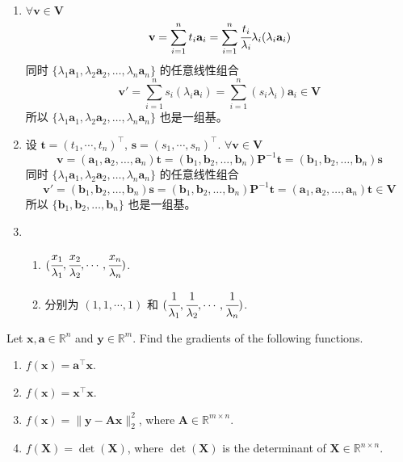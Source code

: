 \documentclass[11pt,letter,notitlepage]{article}
\begin{document}
\begin{solution}
    \begin{enumerate}
        \item $\forall \mathbf{v}\in \mathbf{V}$
              $$\mathbf{v}=\sum_{i=1}^n t_i \mathbf{a}_i=\sum_{i=1}^n \cfrac{t_i}{\lambda_i} \lambda_i (\lambda_i \mathbf{a}_i)$$
              同时 $\{\lambda_1 \mathbf{a}_1, \lambda_2 \mathbf{a}_2, \dots, \lambda_n\mathbf{a}_n\}$ 的任意线性组合
              $$\mathbf{v}'=\sum_{i=1}^n s_i (\lambda_i \mathbf{a}_i)=\sum_{i=1}^n (s_i \lambda_i) \mathbf{a}_i\in \mathbf{V}$$
              所以  $\{\lambda_1 \mathbf{a}_1, \lambda_2 \mathbf{a}_2, \dots, \lambda_n\mathbf{a}_n\}$ 也是一组基。
        \item 设 $\mathbf{t}=(t_1,\cdots,t_n)^\top$, $\mathbf{s}=(s_1,\cdots,s_n)^\top$. $\forall \mathbf{v}\in\mathbf{V}$
              $$\mathbf{v}=(\mathbf{a}_1,\mathbf{a}_2, \dots, \mathbf{a}_n)\mathbf{t}=(\mathbf{b}_1,\mathbf{b}_2,\dots, \mathbf{b}_n)\mathbf{P}^{-1}\mathbf{t}=(\mathbf{b}_1,\mathbf{b}_2,\dots, \mathbf{b}_n)\mathbf{s}$$
              同时 $\{\lambda_1 \mathbf{a}_1, \lambda_2 \mathbf{a}_2, \dots, \lambda_n\mathbf{a}_n\}$ 的任意线性组合
              $$\mathbf{v}'=(\mathbf{b}_1,\mathbf{b}_2,\dots, \mathbf{b}_n)\mathbf{s}=(\mathbf{b}_1,\mathbf{b}_2,\dots, \mathbf{b}_n)\mathbf{P}^{-1}\mathbf{t}=(\mathbf{a}_1,\mathbf{a}_2, \dots, \mathbf{a}_n)\mathbf{t}\in \mathbf{V}$$
              所以 $\{ \mathbf{b}_1, \mathbf{b}_2, \dots, \mathbf{b}_n\}$ 也是一组基。
        \item \begin{enumerate}
                  \item $(\cfrac{x_1}{\lambda_1},\cfrac{x_2}{\lambda_2},\cdots,\cfrac{x_n}{\lambda_n})$.
                  \item 分别为 $(1,1,\cdots,1)$ 和 $(\cfrac{1}{\lambda_1},\cfrac{1}{\lambda_2},\cdots,\cfrac{1}{\lambda_n})$.
              \end{enumerate}
    \end{enumerate}
\end{solution}

\newpage


\begin{exercise}
    Let $\mathbf{x},\mathbf{a}\in \mathbb{R}^n$ and $\mathbf{y}\in \mathbb{R}^m$. Find the gradients of the following functions.
    \begin{enumerate}
        \item $f(\mathbf{x}) = \mathbf{a}^{\top}\mathbf{x}$.
        \item $f(\mathbf{x}) = \mathbf{x}^{\top}\mathbf{x}$.
        \item $f(\mathbf{x})=\| \mathbf{y} - \mathbf{A}\mathbf{x} \|_2^2$, where $\mathbf{A}\in\mathbb{R}^{m\times n}$.
        \item  $f(\mathbf{X}) = \det(\mathbf{X})$, where $\det(\mathbf{X})$ is the determinant of $\mathbf{X} \in \mathbb{R}^{n \times n}$.
    \end{enumerate}
\end{exercise}
\end{document}
